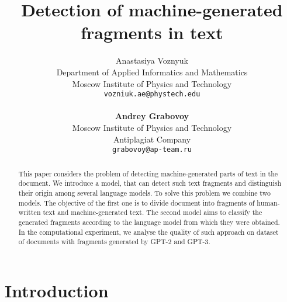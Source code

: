 \documentclass{article}
\title{Detection of machine-generated fragments in text}
\author{ Anastasiya Voznyuk \\
	Department of Applied Informatics and Mathematics\\
	Moscow Institute of Physics and Technology\\
	\texttt{vozniuk.ae@phystech.edu} \\
    \\
    \textbf{Andrey Grabovoy} \\
	Moscow Institute of Physics and Technology\\
    Antiplagiat Company \\
	\texttt{grabovoy@ap-team.ru}}
\date{}
\begin{document}
\maketitle

\begin{abstract}
	This paper considers the problem of detecting machine-generated parts of text in the document. We introduce a model, that can detect such text fragments and distinguish their origin among several language models. To solve this problem we combine two models. The objective of the first one is to divide document into fragments of human-written text and machine-generated text. The second model aims to classify the generated fragments according to the language model from which they were obtained. In the computational experiment, we analyse the quality of such approach on dataset of documents with fragments generated by GPT-2 and GPT-3.
\end{abstract}



\section{Introduction}
\end{document}
